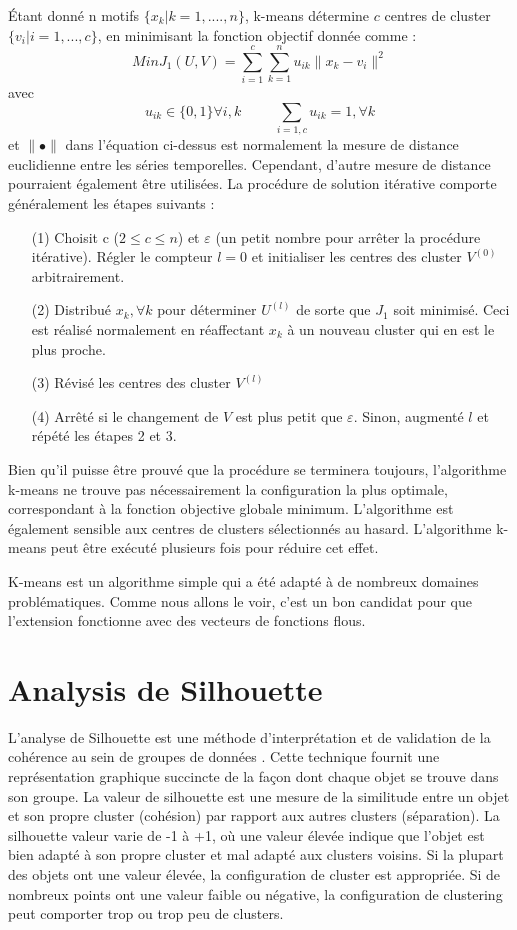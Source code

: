 Étant donné n motifs $ \{ x_k | k = 1,...., n\}$, k-means détermine $c$ centres de cluster $\{ v_i | i = 1,..., c\}$, en minimisant la fonction objectif donnée comme : 
$$Min J_1(U, V) = \sum_{i = 1}^{c} \sum_{k = 1}^{n} u_{ik} \parallel x_k - v_i \parallel ^2 $$
avec 
$$u_{ik} \in \{0, 1\} \forall i,k \hspace{1cm} \sum_{i = 1, c} u_{ik} = 1, \forall k$$
et $\parallel \bullet \parallel$ dans l'équation ci-dessus est normalement la mesure de distance euclidienne entre les séries temporelles. Cependant, d'autre mesure de distance pourraient également être utilisées. La procédure de solution itérative comporte généralement les étapes suivants : 
\begin{itemize}
\item[(1)] Choisit c ($2 \leq c \leq n$) et $\varepsilon$ (un petit nombre pour arrêter la procédure itérative). Régler le compteur $l = 0$ et initialiser les centres des cluster $V^(0)$ arbitrairement.
\item[(2)] Distribué $x_k, \forall k $ pour déterminer $U^{(l)}$ de sorte que $J_1$ soit minimisé. Ceci est réalisé normalement en réaffectant $x_k$ à un nouveau cluster qui en est le plus proche.
\item[(3)] Révisé les centres des cluster $V^(l)$
\item[(4)] Arrêté si le changement de $V$ est plus petit que $\varepsilon$. Sinon, augmenté $l$ et répété les étapes 2 et 3.
\end{itemize}

Bien qu'il puisse être prouvé que la procédure se terminera toujours, l'algorithme k-means ne trouve pas nécessairement la configuration la plus optimale, correspondant à la fonction objective globale minimum. L'algorithme est également sensible aux centres de clusters sélectionnés au hasard. L'algorithme k-means peut être exécuté plusieurs fois pour réduire cet effet.

K-means est un algorithme simple qui a été adapté à de nombreux domaines problématiques. Comme nous allons le voir, c'est un bon candidat pour que l'extension fonctionne avec des vecteurs de fonctions flous.
\section{ Analysis de Silhouette}
L'analyse de Silhouette est une méthode d'interprétation et de validation de la cohérence au sein de groupes de données \cite{rousseeuw1987}. Cette technique fournit une représentation graphique succincte de la façon dont chaque objet se trouve dans son groupe. La valeur de silhouette est une mesure de la similitude entre un objet et son propre cluster (cohésion) par rapport aux autres clusters (séparation). La silhouette valeur varie de -1 à +1, où une valeur élevée indique que l'objet est bien adapté à son propre cluster et mal adapté aux clusters voisins. Si la plupart des objets ont une valeur élevée, la configuration de cluster est appropriée. Si de nombreux points ont une valeur faible ou négative, la configuration de clustering peut comporter trop ou trop peu de clusters.

